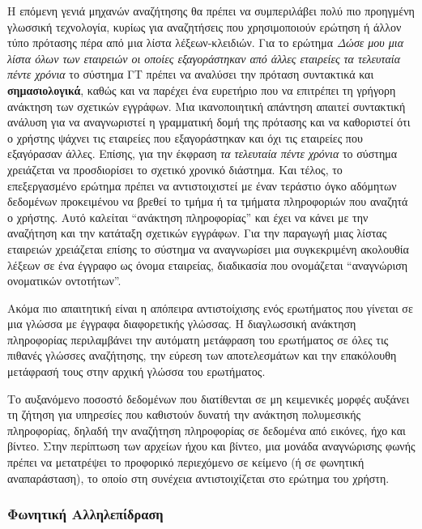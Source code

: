 \begin{multicols}{2}
Η επόμενη γενιά μηχανών αναζήτησης θα πρέπει να συμπεριλάβει πολύ πιο προηγμένη γλωσσική τεχνολογία, κυρίως για αναζητήσεις που χρησιμοποιούν  ερώτηση ή άλλον τύπο πρότασης πέρα από μια λίστα λέξεων-κλειδιών. Για το ερώτημα \textit{Δώσε μου μια λίστα όλων των εταιρειών οι οποίες εξαγοράστηκαν από άλλες εταιρείες τα τελευταία πέντε χρόνια} το σύστημα ΓΤ πρέπει να αναλύσει την πρόταση συντακτικά και  \textbf{σημασιολογικά}, καθώς και να παρέχει ένα ευρετήριο που να επιτρέπει τη γρήγορη ανάκτηση των σχετικών εγγράφων. Μια ικανοποιητική απάντηση απαιτεί συντακτική ανάλυση για να αναγνωριστεί η γραμματική δομή της πρότασης και να καθοριστεί ότι ο χρήστης ψάχνει τις εταιρείες που εξαγοράστηκαν και όχι τις εταιρείες που εξαγόρασαν άλλες. Επίσης, για την έκφραση \textit{τα τελευταία πέντε χρόνια} το σύστημα χρειάζεται να προσδιορίσει το σχετικό χρονικό διάστημα. Και τέλος, το επεξεργασμένο ερώτημα πρέπει να αντιστοιχιστεί με έναν τεράστιο όγκο αδόμητων δεδομένων προκειμένου να βρεθεί το τμήμα ή τα τμήματα πληροφοριών που αναζητά ο χρήστης. Αυτό καλείται ``ανάκτηση πληροφορίας'' και έχει να κάνει με την αναζήτηση και την κατάταξη σχετικών εγγράφων. Για την παραγωγή μιας λίστας εταιρειών χρειάζεται επίσης το σύστημα να αναγνωρίσει  μια συγκεκριμένη ακολουθία λέξεων σε ένα έγγραφο ως όνομα εταιρείας,  διαδικασία που ονομάζεται ``αναγνώριση ονοματικών οντοτήτων''.


Ακόμα πιο απαιτητική είναι η απόπειρα αντιστοίχισης ενός ερωτήματος που γίνεται σε μια γλώσσα με έγγραφα διαφορετικής γλώσσας. Η διαγλωσσική ανάκτηση πληροφορίας περιλαμβάνει την αυτόματη μετάφραση του ερωτήματος σε όλες τις πιθανές γλώσσες αναζήτησης, την εύρεση των αποτελεσμάτων και  την επακόλουθη μετάφρασή τους  στην αρχική γλώσσα του ερωτήματος.

Το αυξανόμενο ποσοστό δεδομένων που διατίθενται σε μη κειμενικές μορφές αυξάνει τη ζήτηση για υπηρεσίες που καθιστούν δυνατή την ανάκτηση πολυμεσικής πληροφορίας, δηλαδή την αναζήτηση πληροφορίας σε δεδομένα από εικόνες, ήχο και βίντεο. Στην περίπτωση των αρχείων ήχου και βίντεο, μια μονάδα αναγνώρισης φωνής πρέπει να μετατρέψει το προφορικό περιεχόμενο σε κείμενο (ή σε φωνητική αναπαράσταση), το οποίο στη συνέχεια αντιστοιχίζεται στο ερώτημα του χρήστη.

\subsubsection{Φωνητική Αλληλεπίδραση}


\end{multicols}
